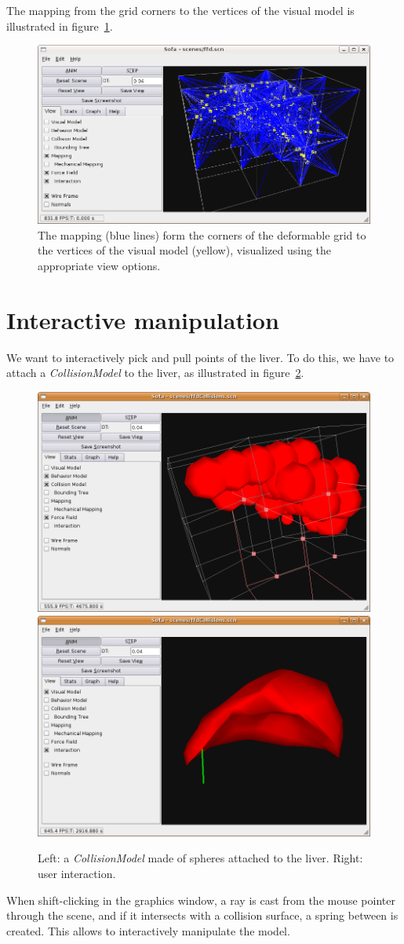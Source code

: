 \documentclass[a4paper,11pt]{article}
\begin{document}
The mapping from the grid corners to the vertices of the visual model is illustrated in figure~\ref{fig:ffd-map}.
\begin{figure}[ht]
	\centering
	\includegraphics[width=0.8\linewidth]{ffd-map}
	\caption{The mapping (blue lines) form the corners of the deformable grid to the vertices of the visual model (yellow), visualized using the appropriate view options.}
	\label{fig:ffd-map}
\end{figure}

\section{Interactive manipulation}
\label{sec:interactive}
We want to interactively pick and pull points of the liver. To do this, we have to attach a \emph{CollisionModel} to the liver, as illustrated in figure~\ref{fig:collisionModel}.
\begin{figure}[ht]
	\centering
	\includegraphics[width=0.48\linewidth]{collisionModel.png}
	\includegraphics[width=0.48\linewidth]{collisionModel01.png}
	\caption{Left: a \emph{CollisionModel} made of spheres attached to the liver. Right: user interaction.}
	\label{fig:collisionModel}
\end{figure}
When shift-clicking in the graphics window, a ray is cast from the mouse pointer through the scene, and if it intersects with a collision surface, a spring between is created. This allows to interactively manipulate the model.
\end{document}
